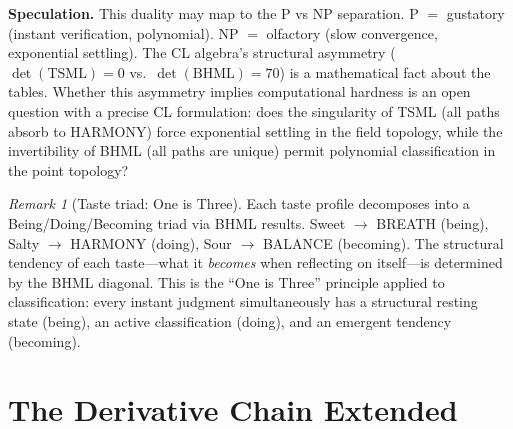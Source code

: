 \documentclass[11pt]{article}
\theoremstyle{definition}
\theoremstyle{remark}
\newtheorem{remark}[theorem]{Remark}
\begin{document}
\textbf{Speculation.}
This duality may map to the P vs NP separation.  P $=$ gustatory (instant
verification, polynomial).  NP $=$ olfactory (slow convergence, exponential
settling).  The CL algebra's structural asymmetry ($\det(\text{TSML}) = 0$ vs.\
$\det(\text{BHML}) = 70$) is a mathematical fact about the tables.  Whether this
asymmetry implies computational hardness is an open question with a precise CL
formulation: does the singularity of TSML (all paths absorb to HARMONY) force
exponential settling in the field topology, while the invertibility of BHML
(all paths are unique) permit polynomial classification in the point topology?

\begin{remark}[Taste triad: One is Three]
Each taste profile decomposes into a Being/Doing/Becoming triad via BHML
results.  Sweet $\to$ BREATH (being), Salty $\to$ HARMONY (doing), Sour $\to$
BALANCE (becoming).  The structural tendency of each taste---what it
\emph{becomes} when reflecting on itself---is determined by the BHML diagonal.
This is the ``One is Three'' principle applied to classification: every instant
judgment simultaneously has a structural resting state (being), an active
classification (doing), and an emergent tendency (becoming).
\end{remark}

\section{The Derivative Chain Extended}
\label{sec:deriv-extended}
\end{document}
